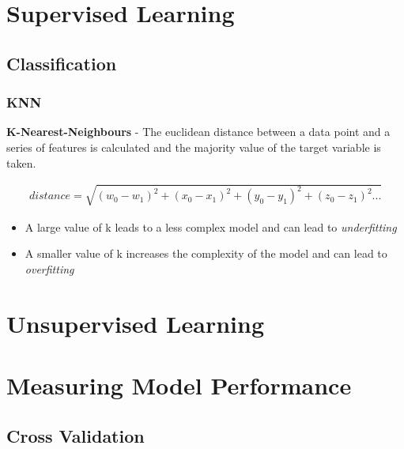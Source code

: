 
\section{Supervised Learning}
\subsection{Classification}
\subsubsection{KNN}
\textbf{K-Nearest-Neighbours} - The euclidean distance between a data point and a series of features is calculated and the majority value of the target variable is taken.

\begin{eqnarray*}
	\textit{distance} = \sqrt{(w_0-w_1)^2+(x_0-x_1)^2+(y_0 - y_1)^2+(z_0 - z_1)^2 ...}
\end{eqnarray*}

\begin{itemize}
	\item A large value of k leads to a less complex model and can lead to \textit{underfitting}
	\item A smaller value of k increases the complexity of the model and can lead to \textit{overfitting}
\end{itemize}
\section{Unsupervised Learning}

\section{Measuring Model Performance}
\subsection{Cross Validation}
